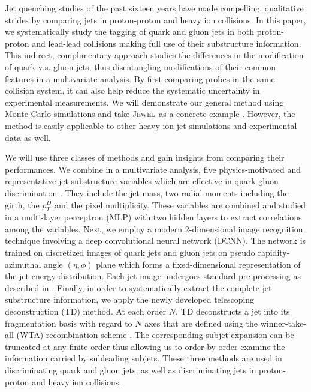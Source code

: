 \documentclass[notoc,preprintnumbers]{JHEP3}
\newcommand{\jw}{\textsc{Jewel}~}
\begin{document}
Jet quenching studies of the past sixteen years have made compelling, qualitative strides by comparing jets in proton-proton and heavy ion collisions. In this paper, we systematically study the tagging of quark and gluon jets in both proton-proton and lead-lead collisions making full use of their substructure information. This indirect, complimentary approach studies the  differences in the modification of quark v.s. gluon jets, thus disentangling modifications of their common features in a multivariate analysis. By first comparing probes in the same collision system, it can also help reduce the systematic uncertainty in experimental measurements. We will demonstrate our general method using Monte Carlo simulations and take \jw as a concrete example \cite{Zapp:2013zya,KunnawalkamElayavalli:2016ttl}. However, the method is easily applicable to other heavy ion jet simulations \cite{Armesto:2009fj,Casalderrey-Solana:2016jvj,Cao:2017zih} and experimental data as well.

We will use three classes of methods and gain insights from comparing their performances. We combine in a multivariate analysis, five physics-motivated and representative jet substructure variables which are effective in quark gluon discrimination \cite{Gallicchio:2012ez}. They include the jet mass, two radial moments including the girth, the $p_T^D$ and the pixel multiplicity. These variables are combined and studied in a multi-layer perceptron (MLP) with two hidden layers to extract correlations among the variables. Next, we employ a modern 2-dimensional image recognition technique involving a deep convolutional neural network (DCNN). The network is trained on discretized images of quark jets and gluon jets on pseudo rapidity-azimuthal angle $(\eta,\phi)$ plane which forms a fixed-dimensional representation of the jet energy distribution. Each jet image undergoes standard pre-processing as described in \cite{deOliveira:2015xxd}. Finally, in order to systematically extract the complete jet substructure information, we apply the newly developed telescoping deconstruction (TD) method. At each order $N$, TD deconstructs a jet into its fragmentation basis with regard to $N$ axes that are defined using the winner-take-all (WTA) recombination scheme \cite{Bertolini:2013iqa}. The corresponding subjet expansion can be truncated at any finite order thus allowing us to order-by-order examine the information carried by subleading subjets. These three methods are used in discriminating quark and gluon jets, as well as discriminating jets in proton-proton and heavy ion collisions.
\end{document}
